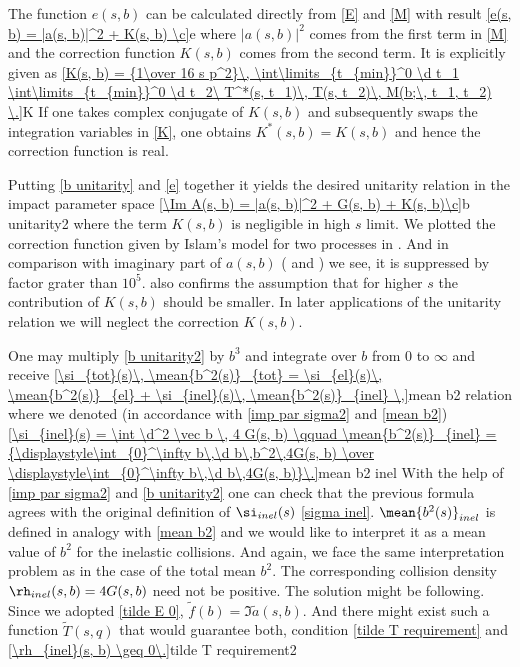 The function $e(s, b)$ can be calculated directly from \equs{} \ref{E} and \ref{M} with result
\eqref{e(s, b) = |a(s, b)|^2 + K(s, b) \c}{e}
where $|a(s, b)|^2$ comes from the first term in \ref{M} and the correction function $K(s, b)$ comes from the second term. It is explicitly given as
\eqref{K(s, b) = {1\over 16 s p^2}\, \int\limits_{t_{min}}^0 \d t_1 \int\limits_{t_{min}}^0 \d t_2\ T^*(s, t_1)\, T(s, t_2)\, M(b;\, t_1, t_2) \.}{K}
If one takes complex conjugate of $K(s, b)$ and subsequently swaps the integration variables in \ref{K}, one obtains $K^*(s, b) = K(s, b)$ and hence the correction function is real.

Putting \ref{b unitarity} and \ref{e} together it yields the desired unitarity relation in the impact parameter space
\eqref{\Im A(s, b) = |a(s, b)|^2 + G(s, b) + K(s, b)\c}{b unitarity2}
where the term $K(s, b)$ is negligible in high $s$ limit. We plotted the correction function given by Islam's model for two processes in \fg{} . And in comparison with imaginary part of $a(s, b)$ (\fgs{}  and ) we see, it is suppressed by factor grater than $10^5$. \Fg{}  also confirms the assumption that for higher $s$ the contribution of $K(s, b)$ should be smaller. In later applications of the unitarity relation we will neglect the correction $K(s, b)$. 

One may multiply \equ{} \ref{b unitarity2} by $b^3$ and integrate over $b$ from $0$ to $\infty$ and receive
\eqref{\si_{tot}(s)\, \mean{b^2(s)}_{tot} = \si_{el}(s)\, \mean{b^2(s)}_{el} + \si_{inel}(s)\, \mean{b^2(s)}_{inel} \,}{mean b2 relation}
where we denoted (in accordance with \equs{} \ref{imp par sigma2} and \ref{mean b2})
\eqref{\si_{inel}(s) = \int \d^2 \vec b \, 4 G(s, b)  \qquad  \mean{b^2(s)}_{inel} = {\displaystyle\int_{0}^\infty b\,\d b\,b^2\,4G(s, b) \over \displaystyle\int_{0}^\infty b\,\d b\,4G(s, b)}\.}{mean b2 inel}
With the help of \equs{} \ref{imp par sigma2} and \ref{b unitarity2} one can check that the previous formula agrees with the original definition of $\si_{inel}(s)$ \ref{sigma inel}. $\mean{b^2(s)}_{inel}$ is defined in analogy with \ref{mean b2} and we would like to interpret it as a mean value of $b^2$ for the inelastic collisions. And again, we face the same interpretation problem as in the case of the total mean $b^2$. The corresponding collision density $\rh_{inel}(s, b) = 4G(s, b)$ need not be positive. The solution might be following. Since we adopted \ref{tilde E 0}, $\tilde f(b) = \Im\tilde a(s, b)$. And there might exist such a function $\tilde T(s, q)$ that would guarantee both, condition \ref{tilde T requirement} and
\eqref{\rh_{inel}(s, b) \geq 0\.}{tilde T requirement2}

